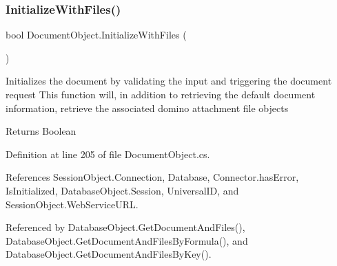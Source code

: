 \subsubsection{\texorpdfstring{Initialize\+With\+Files()}{InitializeWithFiles()}}
{\footnotesize\ttfamily bool Document\+Object.\+Initialize\+With\+Files (\begin{DoxyParamCaption}{ }\end{DoxyParamCaption})}



Initializes the document by validating the input and triggering the document request This function will, in addition to retrieving the default document information, retrieve the associated domino attachment file objects 

\begin{DoxyReturn}{Returns}
Boolean
\end{DoxyReturn}


Definition at line 205 of file Document\+Object.\+cs.



References Session\+Object.\+Connection, Database, Connector.\+has\+Error, Is\+Initialized, Database\+Object.\+Session, Universal\+ID, and Session\+Object.\+Web\+Service\+U\+RL.



Referenced by Database\+Object.\+Get\+Document\+And\+Files(), Database\+Object.\+Get\+Document\+And\+Files\+By\+Formula(), and Database\+Object.\+Get\+Document\+And\+Files\+By\+Key().



